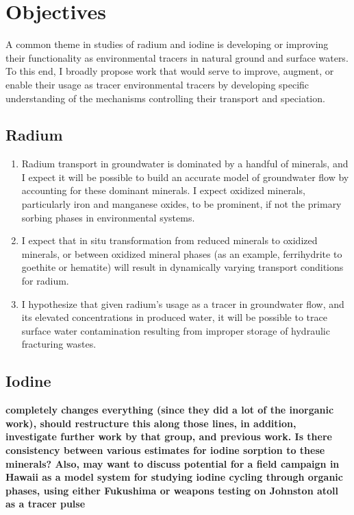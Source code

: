 \documentclass[twoside,12pt,titlepage]{article}
\begin{document}
\section{Objectives}

A common theme in studies of radium and iodine is developing or improving their functionality as environmental tracers in natural ground and surface waters. To this end, I broadly propose work that would serve to improve, augment, or enable their usage as tracer environmental tracers by developing specific understanding of the mechanisms controlling their transport and speciation.
\subsection{Radium}

\begin{enumerate}[label=\arabic*)]
	\item Radium transport in groundwater is dominated by a handful of minerals, and I expect it will be possible to build an accurate model of groundwater flow by accounting for these dominant minerals. I expect oxidized minerals, particularly iron and manganese oxides, to be prominent, if not the primary sorbing phases in environmental systems.
	\item I expect that in situ transformation from reduced minerals to oxidized minerals, or between oxidized mineral phases (as an example, ferrihydrite to goethite or hematite) will result in dynamically varying transport conditions for radium.
	\item I hypothesize that given radium's usage as a tracer in groundwater flow, and its elevated concentrations in produced water, it will be possible to trace surface water contamination resulting from improper storage of hydraulic fracturing wastes.
\end{enumerate}

\subsection{Iodine}

\textbf{\cite{Fuhrmann1998} completely changes everything (since they did a lot of the inorganic work), should restructure this along those lines, in addition, investigate further work by that group, and previous work. Is there consistency between various estimates for iodine sorption to these minerals? Also, may want to discuss potential for a field campaign in Hawaii as a model system for studying iodine cycling through organic phases, using either Fukushima or weapons testing on Johnston atoll as a tracer pulse}
\end{document}
